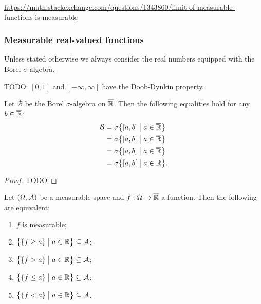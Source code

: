 \url{https://math.stackexchange.com/questions/1343860/limit-of-measurable-functions-is-measurable}


\subsubsection{Measurable real-valued functions}
Unless stated otherwise we always consider the real numbers equipped with the Borel $\sigma$-algebra.

\begin{proposition}
TODO: $[0,1]$ and $[-\infty,\infty]$ have the Doob-Dynkin property.
\end{proposition}

\begin{proposition}
Let $\mathcal{B}$ be the Borel $\sigma$-algebra on $\overline{\mathbb{R}}$. Then the following equalities hold for any $b\in\overline{\mathbb{R}}$:
\begin{align*}
\mathcal{B} &= \sigma\setbuilder{\interval[c]{a,b}}{a\in \overline{\R}}\\
&= \sigma\setbuilder{\interval[o]{a,b}}{a\in \overline{\R}} \\
&= \sigma\setbuilder{\interval[oc]{a,b}}{a\in \overline{\R}} \\
&= \sigma\setbuilder{\interval[co]{a,b}}{a\in \overline{\R}}.
\end{align*}
\end{proposition}
\begin{proof}
TODO
\end{proof}
\begin{corollary} \label{measurablesSetsRealMeasurableFunction}
Let $\left( \Omega, \mathcal{A} \right)$ be a measurable space and $f: \Omega \to \overline{\mathbb{R}}$ a function. Then the following are equivalent:
\begin{enumerate}
\item $f$ is measurable;
\item $\setbuilder{\{f\geq a\}\big.}{a\in\R} \subseteq \mathcal{A}$;
\item $\setbuilder{\{f > a\}\big.}{a\in\R} \subseteq \mathcal{A}$;
\item $\setbuilder{\{f \leq a\}\big.}{a\in\R} \subseteq \mathcal{A}$;
\item $\setbuilder{\{f < a\}\big.}{a\in\R} \subseteq \mathcal{A}$.
\end{enumerate}
\end{corollary}

